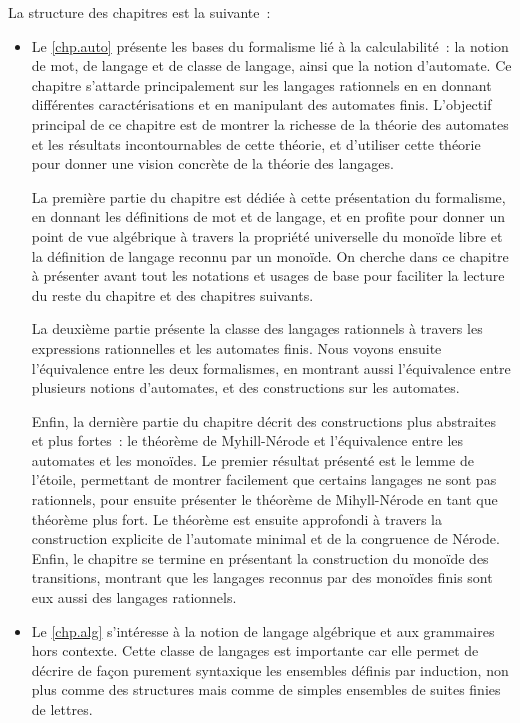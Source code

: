 La structure des chapitres est la suivante~:
\begin{itemize}
\item Le \cref{chp.auto} présente les bases du formalisme lié à la
  calculabilité~: la notion de mot, de langage et de classe de langage, ainsi
  que la notion d'automate. Ce chapitre s'attarde principalement sur les
  langages rationnels en en donnant différentes caractérisations et en
  manipulant des automates finis. L'objectif principal de ce chapitre est de
  montrer la richesse de la théorie des automates et les résultats
  incontournables de cette théorie, et d'utiliser cette théorie pour donner une
  vision concrète de la théorie des langages.

  La première partie du chapitre est dédiée à cette présentation du formalisme,
  en donnant les définitions de mot et de langage, et en profite pour donner un
  point de vue algébrique à travers la propriété universelle du monoïde libre et
  la définition de langage reconnu par un monoïde. On cherche dans ce chapitre à
  présenter avant tout les notations et usages de base pour faciliter la lecture
  du reste du chapitre et des chapitres suivants.

  La deuxième partie présente la classe des langages rationnels à travers les
  expressions rationnelles et les automates finis. Nous voyons ensuite
  l'équivalence entre les deux formalismes, en montrant aussi l'équivalence
  entre plusieurs notions d'automates, et des constructions sur les automates.

  Enfin, la dernière partie du chapitre décrit des constructions plus abstraites
  et plus fortes~: le théorème de Myhill-Nérode et l'équivalence
  entre les automates et les monoïdes. Le premier résultat présenté est le lemme
  de l'étoile, permettant de montrer facilement que certains langages ne sont
  pas rationnels, pour ensuite présenter le théorème de
  Mihyll-Nérode en tant que théorème plus fort. Le théorème est
  ensuite approfondi à travers la construction explicite de l'automate minimal
  et de la congruence de Nérode.
  Enfin, le chapitre se termine en présentant la construction du monoïde des
  transitions, montrant que les langages reconnus par des monoïdes finis sont
  eux aussi des langages rationnels.

\item Le \cref{chp.alg} s'intéresse à la notion de langage algébrique et aux
  grammaires hors contexte. Cette classe de langages est importante
  car elle permet de décrire de façon purement syntaxique les ensembles définis
  par induction, non plus comme des structures mais comme de simples ensembles
  de suites finies de lettres.


\end{itemize}
